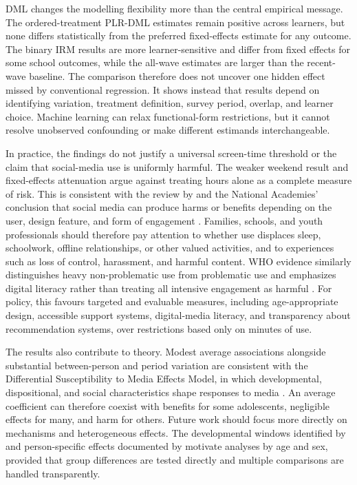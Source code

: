 \documentclass[11pt,oneside,a4paper]{book}
\begin{document}
DML changes the modelling flexibility more than the central empirical message. The ordered-treatment PLR-DML estimates remain positive across learners, but none differs statistically from the preferred fixed-effects estimate for any outcome. The binary IRM results are more learner-sensitive and differ from fixed effects for some school outcomes, while the all-wave estimates are larger than the recent-wave baseline. The comparison therefore does not uncover one hidden effect missed by conventional regression. It shows instead that results depend on identifying variation, treatment definition, survey period, overlap, and learner choice. Machine learning can relax functional-form restrictions, but it cannot resolve unobserved confounding or make different estimands interchangeable.

In practice, the findings do not justify a universal screen-time threshold or the claim that social-media use is uniformly harmful. The weaker weekend result and fixed-effects attenuation argue against treating hours alone as a complete measure of risk. This is consistent with the review by \citet{valkenburg2022umbrella} and the National Academies' conclusion that social media can produce harms or benefits depending on the user, design feature, and form of engagement \citep{nasem2024socialmedia}. Families, schools, and youth professionals should therefore pay attention to whether use displaces sleep, schoolwork, offline relationships, or other valued activities, and to experiences such as loss of control, harassment, and harmful content. WHO evidence similarly distinguishes heavy non-problematic use from problematic use and emphasizes digital literacy rather than treating all intensive engagement as harmful \citep{whoeurope2024screens}. For policy, this favours targeted and evaluable measures, including age-appropriate design, accessible support systems, digital-media literacy, and transparency about recommendation systems, over restrictions based only on minutes of use.

The results also contribute to theory. Modest average associations alongside substantial between-person and period variation are consistent with the Differential Susceptibility to Media Effects Model, in which developmental, dispositional, and social characteristics shape responses to media \citep{valkenburgpeter2013dsmm}. An average coefficient can therefore coexist with benefits for some adolescents, negligible effects for many, and harm for others. Future work should focus more directly on mechanisms and heterogeneous effects. The developmental windows identified by \citet{orben2022windows} and person-specific effects documented by \citet{beyens2020effect} motivate analyses by age and sex, provided that group differences are tested directly and multiple comparisons are handled transparently.
\end{document}
